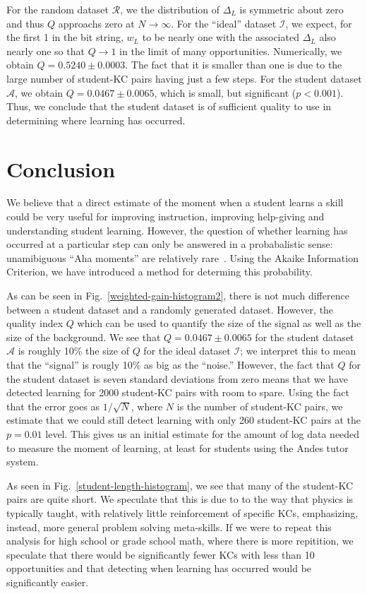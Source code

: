 \documentclass{acmlarge-edm}
\begin{document}
For the random dataset $\mathcal{R}$, we the distribution of $\Delta_L$
is symmetric about zero and thus $Q$ approachs zero at $N \to \infty$.
For the ``ideal'' dataset $\mathcal{I}$, we expect, for the first 1 in
the bit string, $w_L$ to be nearly one with the associated $\Delta_L$
also nearly one so that $Q\to 1$ in the limit of many opportunities.
Numerically, we obtain $Q=0.5240\pm0.0003$.  The fact that it is
smaller than one is due to the large number of student-KC pairs having
just a few steps.  For the student dataset $\mathcal{A}$, we obtain
$Q=0.0467\pm0.0065$, which is small, but significant
($p<0.001$). Thus, we conclude that the student dataset is of
sufficient quality to use in determining where learning has occurred.


\section{Conclusion}

We believe that a direct estimate of the moment when a student
learns a skill could be very useful for improving instruction,
improving help-giving and understanding student learning.
However, the question of whether learning has occurred at a particular
step can only be answered in a probabalistic sense:
unamibiguous ``Aha moments'' are relatively rare~\cite{}.
Using the Akaike Information Criterion, we have introduced a method
for determing this probability.

As can be seen in
Fig.~\ref{weighted-gain-histogram2}, there is not much difference
between a student dataset and a randomly generated dataset.  However,
the quality index $Q$ which can be used to quantify the
size of the signal as well as the size of the background.  We see that
$Q=0.0467\pm0.0065$ for the student dataset $\mathcal{A}$ is roughly
10\% the size of $Q$ for the ideal dataset $\mathcal{I}$; we interpret
this to mean that the ``signal'' is rougly 10\% as big as the
``noise.''  However, the fact that $Q$ for the student dataset is
seven standard deviations from zero means that we have detected
learning for 2000 student-KC pairs with room to spare.  Using the fact
that the error goes as $1/\sqrt{N}$, where $N$ is the number 
of student-KC pairs, we estimate
that we could still detect learning with only 260 student-KC pairs at the
$p=0.01$ level.  This gives us an initial estimate for the amount of
log data needed to measure the moment of learning, at least for
students using the Andes tutor system.

As seen in Fig.~\ref{student-length-histogram}, we see that many of
the student-KC pairs are quite short.  We speculate that this
is due to to the way that physics is typically taught, with relatively
little reinforcement of specific KCs, emphasizing, instead, more
general problem solving meta-skills.  If we were to repeat this
analysis for high school or grade school math, where there is more
repitition, we speculate that there would be significantly fewer KCs
with less than 10 opportunities and that detecting when learning has
occurred would be significantly easier.




\end{document}
